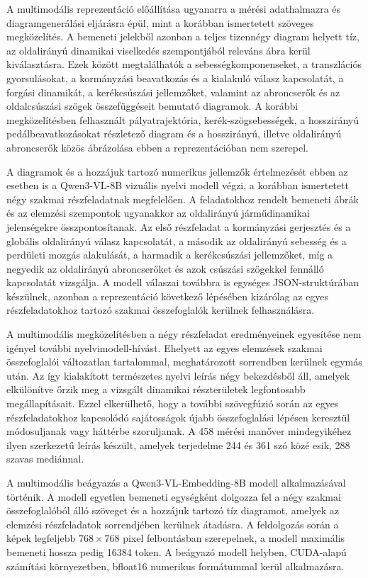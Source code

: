 \documentclass[12pt,a4paper,onehalfspacing, oneside]{book} %
\begin{document}
A multimodális reprezentáció előállítása ugyanarra a mérési adathalmazra és diagramgenerálási eljárásra épül, mint a korábban ismertetett szöveges megközelítés. A bemeneti jelekből azonban a teljes tizennégy diagram helyett tíz, az oldalirányú dinamikai viselkedés szempontjából releváns ábra kerül kiválasztásra. Ezek között megtalálhatók a sebességkomponenseket, a transzlációs gyorsulásokat, a kormányzási beavatkozás és a kialakuló válasz kapcsolatát, a forgási dinamikát, a kerékcsúszási jellemzőket, valamint az abroncserők és az oldalcsúszási szögek összefüggéseit bemutató diagramok. A korábbi megközelítésben felhasznált pályatrajektória, kerék-szögsebességek, a hosszirányú pedálbeavatkozásokat részletező diagram és a hosszirányú, illetve oldalirányú abroncserők közös ábrázolása ebben a reprezentációban nem szerepel.

A diagramok és a hozzájuk tartozó numerikus jellemzők értelmezését ebben az esetben is a Qwen3-VL-8B vizuális nyelvi modell végzi, a korábban ismertetett négy szakmai részfeladatnak megfelelően. A feladatokhoz rendelt bemeneti ábrák és az elemzési szempontok ugyanakkor az oldalirányú járműdinamikai jelenségekre összpontosítanak. Az első részfeladat a kormányzási gerjesztés és a globális oldalirányú válasz kapcsolatát, a második az oldalirányú sebesség és a perdületi mozgás alakulását, a harmadik a kerékcsúszási jellemzőket, míg a negyedik az oldalirányú abroncserőket és azok csúszási szögekkel fennálló kapcsolatát vizsgálja. A modell válaszai továbbra is egységes JSON-struktúrában készülnek, azonban a reprezentáció következő lépésében kizárólag az egyes részfeladatokhoz tartozó szakmai összefoglalók kerülnek felhasználásra.

A multimodális megközelítésben a négy részfeladat eredményeinek egyesítése nem igényel további nyelvimodell-hívást. Ehelyett az egyes elemzések szakmai összefoglalói változatlan tartalommal, meghatározott sorrendben kerülnek egymás után. Az így kialakított természetes nyelvi leírás négy bekezdésből áll, amelyek elkülönítve őrzik meg a vizsgált dinamikai részterületek legfontosabb megállapításait. Ezzel elkerülhető, hogy a további szövegfúzió során az egyes részfeladatokhoz kapcsolódó sajátosságok újabb összefoglalási lépésen keresztül módosuljanak vagy háttérbe szoruljanak. A 458 mérési manőver mindegyikéhez ilyen szerkezetű leírás készült, amelyek terjedelme 244 és 361 szó közé esik, 288 szavas mediánnal.

A multimodális beágyazás a Qwen3-VL-Embedding-8B modell alkalmazásával történik. A modell egyetlen bemeneti egységként dolgozza fel a négy szakmai összefoglalóból álló szöveget és a hozzájuk tartozó tíz diagramot, amelyek az elemzési részfeladatok sorrendjében kerülnek átadásra. A feldolgozás során a képek legfeljebb $768\times768$ pixel felbontásban szerepelnek, a modell maximális bemeneti hossza pedig 16384 token. A beágyazó modell helyben, CUDA-alapú számítási környezetben, bfloat16 numerikus formátummal kerül alkalmazásra.
\end{document}
